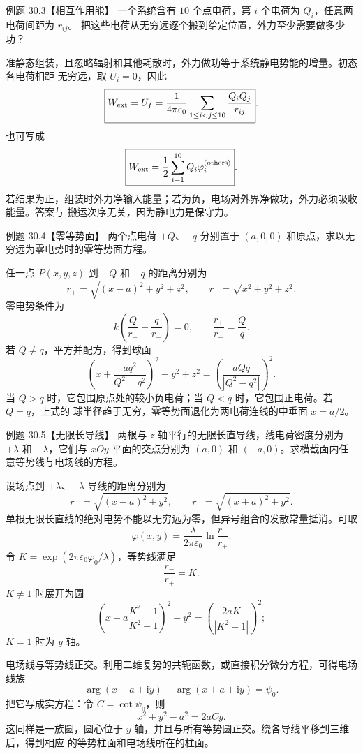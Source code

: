 \Needspace{0.3\textheight}
\begin{origexamplebox}{例题 30.3【相互作用能】}
一个系统含有 $10$ 个点电荷，第 $i$ 个电荷为 $Q_i$，任意两电荷间距为 $r_{ij}$。
把这些电荷从无穷远逐个搬到给定位置，外力至少需要做多少功？
\end{origexamplebox}

\begin{xesolution}
准静态组装，且忽略辐射和其他耗散时，外力做功等于系统静电势能的增量。初态各电荷相距
无穷远，取 $U_i=0$，因此
\[
  \boxed{W_{\rm ext}=U_f
  =\frac{1}{4\pi\varepsilon_0}
  \sum_{1\le i<j\le10}\frac{Q_iQ_j}{r_{ij}}}.
\]
也可写成
\[
  \boxed{W_{\rm ext}=\frac12\sum_{i=1}^{10}
  Q_i\varphi_i^{(\mathrm{others})}}.
\]
若结果为正，组装时外力净输入能量；若为负，电场对外界净做功，外力必须吸收能量。答案与
搬运次序无关，因为静电力是保守力。
\end{xesolution}

\Needspace{0.34\textheight}
\begin{origexamplebox}{例题 30.4【零等势面】}
两个点电荷 $+Q$、$-q$ 分别置于 $(a,0,0)$ 和原点，求以无穷远为零电势时的零等势面方程。
\zeroPotentialSphereDiagram
\end{origexamplebox}

\begin{xesolution}
任一点 $P(x,y,z)$ 到 $+Q$ 和 $-q$ 的距离分别为
\[
  r_+=\sqrt{(x-a)^2+y^2+z^2},
  \qquad
  r_-=\sqrt{x^2+y^2+z^2}.
\]
零电势条件为
\[
  k\left(\frac Q{r_+}-\frac q{r_-}\right)=0,
  \qquad
  \frac{r_+}{r_-}=\frac Qq.
\]
若 $Q\ne q$，平方并配方，得到球面
\[
  \boxed{\left(x+\frac{aq^2}{Q^2-q^2}\right)^2+y^2+z^2
  =\left(\frac{aQq}{|Q^2-q^2|}\right)^2}.
\]
当 $Q>q$ 时，它包围原点处的较小负电荷；当 $Q<q$ 时，它包围正电荷。若 $Q=q$，上式的
球半径趋于无穷，零等势面退化为两电荷连线的中垂面 $x=a/2$。
\end{xesolution}

\Needspace{0.36\textheight}
\begin{origexamplebox}{例题 30.5【无限长导线】}
两根与 $z$ 轴平行的无限长直导线，线电荷密度分别为 $+\lambda$ 和 $-\lambda$，它们与
$xOy$ 平面的交点分别为 $(a,0)$ 和 $(-a,0)$。求横截面内任意等势线与电场线的方程。
\twoLineDiagram
\end{origexamplebox}

\begin{xesolution}
设场点到 $+\lambda$、$-\lambda$ 导线的距离分别为
\[
  r_+=\sqrt{(x-a)^2+y^2},
  \qquad
  r_-=\sqrt{(x+a)^2+y^2}.
\]
单根无限长直线的绝对电势不能以无穷远为零，但异号组合的发散常量抵消。可取
\[
  \boxed{\varphi(x,y)=\frac{\lambda}{2\pi\varepsilon_0}
  \ln\frac{r_-}{r_+}}.
\]
令 $K=\exp(2\pi\varepsilon_0\varphi_0/\lambda)$，等势线满足
\[
  \boxed{\frac{r_-}{r_+}=K}.
\]
$K\ne1$ 时展开为圆
\[
  \boxed{\left(x-a\frac{K^2+1}{K^2-1}\right)^2+y^2
  =\left(\frac{2aK}{|K^2-1|}\right)^2};
\]
$K=1$ 时为 $y$ 轴。

电场线与等势线正交。利用二维复势的共轭函数，或直接积分微分方程，可得电场线族
\[
  \boxed{\arg(x-a+\mathrm i y)-\arg(x+a+\mathrm i y)=\psi_0}.
\]
把它写成实方程：令 $C=\cot\psi_0$，则
\[
  \boxed{x^2+y^2-a^2=2aCy}.
\]
这同样是一族圆，圆心位于 $y$ 轴，并且与所有等势圆正交。绕各导线平移到三维后，得到相应
的等势柱面和电场线所在的柱面。
\end{xesolution}

